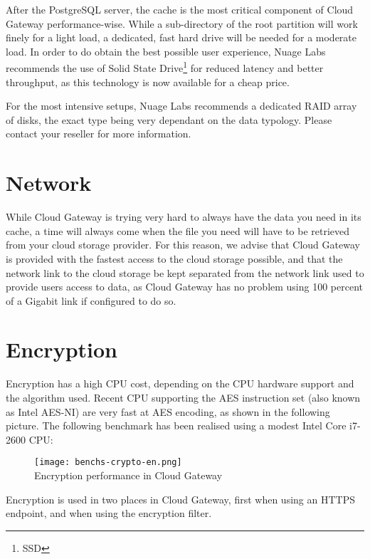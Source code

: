 \documentclass[11pt,fleqn,openany]{book} %
\begin{document}
After the PostgreSQL server, the cache is the most critical component of Cloud Gateway performance-wise. While a sub-directory of the root partition will
work finely for a light load, a dedicated, fast hard drive will be needed for a moderate load. In order to do obtain the best possible user experience,
Nuage Labs recommends the use of Solid State Drive\footnote{SSD} for reduced latency and better throughput, as this technology is now available for a cheap price.

For the most intensive setups, Nuage Labs recommends a dedicated RAID array of disks, the exact type being very dependant on the data typology.
Please contact your reseller for more information.

\section{Network}
\label{sec:network}

While Cloud Gateway is trying very hard to always have the data you need in its cache, a time will always come when the file you need
will have to be retrieved from your cloud storage provider. For this reason, we advise that Cloud Gateway is provided with the fastest
access to the cloud storage possible, and that the network link to the cloud storage be kept separated from the network link used to
provide users access to data, as Cloud Gateway has no problem using 100 percent of a Gigabit link if configured to do so.

\section{Encryption}
\label{sec:performance-encryption}

Encryption has a high CPU cost, depending on the CPU hardware support and the algorithm used. Recent CPU supporting the AES instruction set (also known as Intel AES-NI) are very fast at AES encoding,
as shown in the following picture. The following benchmark has been realised using a modest Intel Core i7-2600 CPU:

\begin{figure}[H]
\centering
\texttt{[image: benchs-crypto-en.png]}\\
Encryption performance in Cloud Gateway
\end{figure}

Encryption is used in two places in Cloud Gateway, first when using an HTTPS endpoint, and when using the encryption filter.
\end{document}
